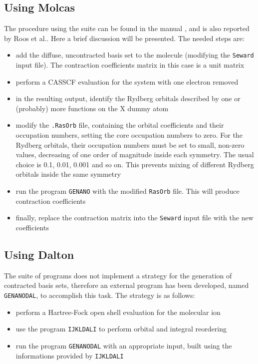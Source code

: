 \subsection*{Using Molcas}

The procedure using the \molcas suite can be found in the manual
\cite{molcas-site}, and is also reported by Roos et al.\cite{roos-qmescca}.
Here a brief discussion will be presented. The needed steps are:
\begin{itemize}
\item add the diffuse, uncontracted basis set to the molecule (modifying the
\texttt{Seward} input file). The contraction coefficients matrix in this case is a
unit matrix
\item perform a CASSCF evaluation for the system with one electron removed
\item in the resulting output, identify the Rydberg orbitals described by one or
(probably) more functions on the X dummy atom
\item modify the \texttt{.RasOrb} file, containing the orbital coefficients
and their occupation numbers, setting the core occupation numbers to
zero. For the Rydberg orbitals, their occupation numbers must be set
to small, non-zero values, decreasing of one order of magnitude inside each
symmetry. The usual choice is 0.1, 0.01, 0.001 and so on. This prevents
mixing of different Rydberg orbitals inside the same symmetry
\item run the program \texttt{GENANO} with the modified \texttt{RasOrb}
file. This will produce contraction coefficients
\item finally, replace the contraction matrix into the \texttt{Seward} input
file with the new coefficients
\end{itemize}

\subsection*{Using Dalton}

The \dalton suite of programs does not implement a strategy for the
generation of contracted basis sets, therefore an external program has been
developed, named \texttt{GENANODAL}, to accomplish this task. The strategy
is as follows: 
\begin{itemize}
\item perform a Hartree-Fock open shell evaluation for the molecular ion
\item use the program \texttt{IJKLDALI} to perform orbital and integral reordering
\item run the program \texttt{GENANODAL} with an appropriate input, built using the
informations provided by \texttt{IJKLDALI}
\end{itemize}

